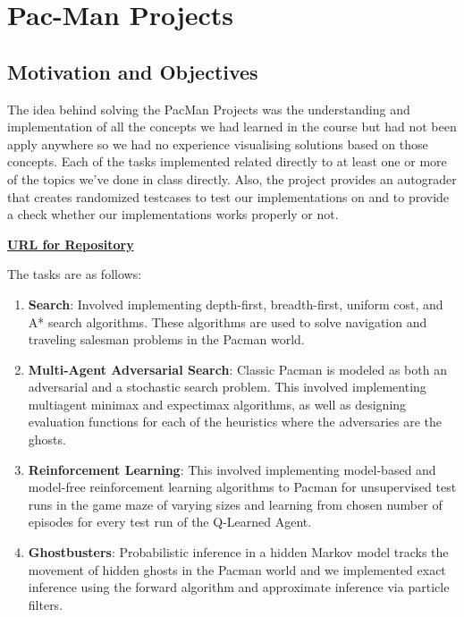 \chapter{Pac-Man Projects}

\section{Motivation and Objectives}

The idea behind solving the PacMan Projects was the understanding and implementation of all the concepts we had learned in the course but had not been apply anywhere so we had no experience visualising solutions based on those concepts. Each of the tasks implemented related directly to at least one or more of the topics we've done in class directly. Also, the project provides an autograder that creates randomized testcases to test our implementations on and to provide a check whether our implementations works properly or not.

\textbf{\href{https://github.com/mankeyboy/AI_Project}{URL for Repository}}

The tasks are as follows:
\begin{enumerate}
\item \textbf{Search}: Involved implementing depth-first, breadth-first, uniform cost, and A* search algorithms. These algorithms are used to solve navigation and traveling salesman problems in the Pacman world.

\item \textbf{Multi-Agent Adversarial Search}: Classic Pacman is modeled as both an adversarial and a stochastic search problem. This involved implementing multiagent minimax and expectimax algorithms, as well as designing evaluation functions for each of the heuristics where the adversaries are the ghosts.

\item \textbf{Reinforcement Learning}: This involved implementing model-based and model-free reinforcement learning algorithms to Pacman for unsupervised test runs in the game maze of varying sizes and learning from chosen number of episodes for every test run of the Q-Learned Agent.

\item \textbf{Ghostbusters}: Probabilistic inference in a hidden Markov model tracks the movement of hidden ghosts in the Pacman world and we implemented exact inference using the forward algorithm and approximate inference via particle filters.
\end{enumerate}

